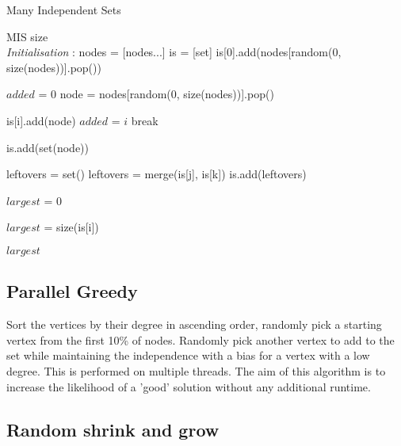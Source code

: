\documentclass[conference]{IEEEtran}
\begin{document}
 \begin{algorithm}
 \caption{Many Independent Sets}
 \begin{algorithmic}[1]
 \renewcommand{\algorithmicrequire}{\textbf{Input:}}
 \renewcommand{\algorithmicensure}{\textbf{Output:}}
 \ENSURE  MIS size
 \\ \textit{Initialisation} :
    \STATE nodes = [nodes...]
    \STATE is = [set]
    \STATE is[0].add(nodes[random(0, size(nodes))].pop())

        \STATE $added$ = 0
        \STATE node = nodes[random(0, size(nodes))].pop()
        
                \STATE is[i].add(node)
                \STATE $added$ = $i$
                \STATE break
            \ENDIF
        \ENDFOR

            \STATE is.add(set(node))
        \ENDIF
    \ENDWHILE

                \STATE leftovers = set()
                \STATE leftovers = merge(is[j], is[k])
                \STATE is.add(leftovers)
            \ENDFOR
        \ENDFOR

    \ENDFOR




    \STATE $largest$ = 0

            \STATE $largest$ = size(is[i])
        \ENDIF
    \ENDFOR

  \RETURN $largest$
 \end{algorithmic} 
 \end{algorithm}

\subsection{Parallel Greedy}

Sort the vertices by their degree in ascending order, randomly pick a starting vertex from the first 10\% of nodes. 
Randomly pick another vertex to add to the set while maintaining the independence with a bias for a vertex with a low 
degree. This is performed on multiple threads. The aim of this algorithm is to increase the likelihood of a 'good' 
solution without any additional runtime.

\subsection{Random shrink and grow}
\end{document}
